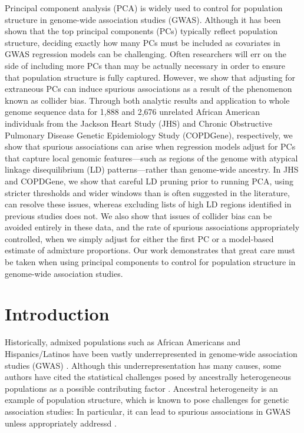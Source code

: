 \documentclass[12pt]{article}
\begin{document}

Principal component analysis (PCA) is widely used to control for population structure in genome-wide association studies (GWAS). Although it has been shown that the top principal components (PCs) typically reflect population structure, deciding exactly how many PCs must be included as covariates in GWAS regression models can be challenging. Often researchers will err on the side of including more PCs than may be actually necessary in order to ensure that population structure is fully captured. However, we show that adjusting for extraneous PCs can induce spurious associations as a result of the phenomenon known as collider bias. Through both analytic results and application to whole genome sequence data for 1,888 and 2,676 unrelated African American individuals from the Jackson Heart Study (JHS) and Chronic Obstructive Pulmonary Disease Genetic Epidemiology Study (COPDGene), respectively, we show that spurious associations can arise when regression models adjust for PCs that capture local genomic features—such as regions of the genome with atypical linkage disequilibrium (LD) patterns—rather than genome-wide ancestry. In JHS and COPDGene, we show that careful LD pruning prior to running PCA, using stricter thresholds and wider windows than is often suggested in the literature, can resolve these issues, whereas excluding lists of high LD regions identified in previous studies does not. We also show that issues of collider bias can be avoided entirely in these data, and the rate of spurious associations appropriately controlled, when we simply adjust for either the first PC or a model-based estimate of admixture proportions. Our work demonstrates that great care must be taken when using principal components to control for population structure in genome-wide association studies. 


\newpage
\section{Introduction}


Historically, admixed populations such as African Americans and Hispanics/Latinos have been vastly underrepresented in genome-wide association studies (GWAS) \cite{need2009, bustamante2011, popejoy2016, morales2018, sirugo2019, martin2019}. 
Although this underrepresentation has many causes, some authors have cited the statistical challenges posed by ancestrally heterogeneous populations as a possible contributing factor \citep{need2009, bustamante2011, popejoy2016}. 
Ancestral heterogeneity is an example of population structure, which is known to pose challenges for genetic association studies:
In particular, it can lead to spurious associations in GWAS unless appropriately addressd \citep{}.
\end{document}
